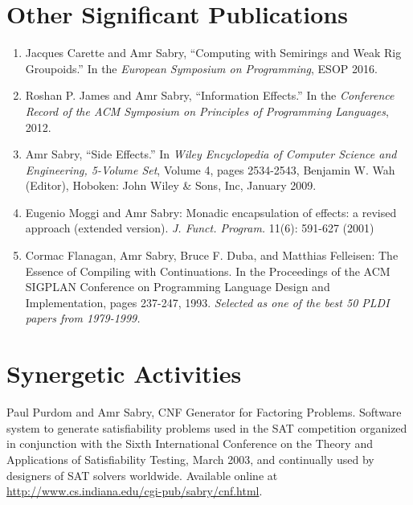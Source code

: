 \documentclass[11pt]{article}
\begin{document}
\nocite{DQT2014, geometry2013, VDS2009, AGVS2005, VAS2006}
\printbibliography[title={Closely Related Publications}]

\section*{Other Significant Publications} 

\begin{enumerate}

\item Jacques Carette and Amr Sabry, ``Computing with Semirings and Weak Rig
  Groupoids.'' In the \emph{European Symposium on Programming}, ESOP 2016.

\item Roshan P. James and Amr Sabry, ``Information Effects.'' In the
  \emph{Conference Record of the ACM Symposium on Principles of Programming
  Languages}, 2012.

\item Amr Sabry, ``Side Effects.'' In \emph{Wiley Encyclopedia of Computer
  Science and Engineering, 5-Volume Set}, Volume 4, pages 2534-2543, Benjamin
  W. Wah (Editor), Hoboken: John Wiley \& Sons, Inc, January 2009.

\item Eugenio Moggi and Amr Sabry: Monadic encapsulation of effects: 
a revised approach (extended version). \emph{J. Funct. Program.} 11(6):
591-627 (2001)

\item Cormac Flanagan, Amr Sabry, Bruce F. Duba, and Matthias Felleisen:
The Essence of Compiling with Continuations. In the Proceedings of the ACM
SIGPLAN Conference on Programming Language Design and Implementation, pages
237-247, 1993. \emph{Selected as one of the best 50 PLDI papers from
1979-1999.}
\end{enumerate}

\section*{Synergetic Activities}

Paul Purdom and Amr Sabry, CNF Generator for Factoring Problems.  Software
system to generate satisfiability problems used in the SAT competition
organized in conjunction with the Sixth International Conference on the
Theory and Applications of Satisfiability Testing, March 2003, and
continually used by designers of SAT solvers worldwide. Available online at
\url{http://www.cs.indiana.edu/cgi-pub/sabry/cnf.html}.
\end{document}
